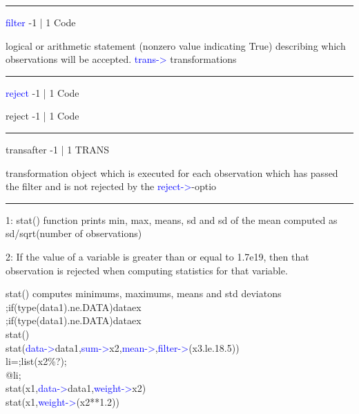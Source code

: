 \vspace{0.3cm}
\hrule
\vspace{0.3cm}
\noindent \textcolor{blue}{filter}  \tabto{3cm} -1 | 1 \tabto{5cm}  Code \tabto{7cm}
\begin{changemargin}{3cm}{0cm}
\noindent  logical or arithmetic statement (nonzero value indicating True) describing which observations will be accepted. \textcolor{blue}{trans->} transformations
\end{changemargin}
\vspace{0.3cm}
\hrule
\vspace{0.3cm}
\noindent \textcolor{blue}{reject}  \tabto{3cm} -1 | 1 \tabto{5cm}  Code \tabto{7cm}
\begin{changemargin}{3cm}{0cm}
\noindent \noindent reject  \tabto{3cm} -1 | 1 \tabto{5cm}  Code \tabto{7cm}
\end{changemargin}
\vspace{0.3cm}
\hrule
\vspace{0.3cm}
\noindent transafter  \tabto{3cm} -1 | 1 \tabto{5cm}   TRANS \tabto{7cm}
\begin{changemargin}{3cm}{0cm}
\noindent  transformation object which is executed for each observation which has passed the filter and is not rejected by the \textcolor{blue}{reject->}-optio
\end {changemargin}
\hrule
\vspace{0.2cm}
\begin{note}
1: \textcolor{VioletRed}{stat}() function prints min, max, means, sd and sd of the mean computed
as sd/\textcolor{VioletRed}{sqrt}(number of observations)
\end{note}
\begin{note}
2: If the value of a variable is greater than or equal to 1.7e19,
then that observation is rejected when computing statistics for that variable.
\end{note}
\begin{example}[statex]stat() computes minimums, maximums, means and std deviatons\\
\label{statex}
;if(\textcolor{VioletRed}{type}(data1).ne.DATA)dataex\\
;if(\textcolor{VioletRed}{type}(data1).ne.DATA)dataex\\
\textcolor{VioletRed}{stat}()\\
\textcolor{VioletRed}{stat}(\textcolor{blue}{data->}data1,\textcolor{blue}{sum->}x2,\textcolor{blue}{mean->},\textcolor{blue}{filter->}(x3.le.18.5))\\
li=;list(x2\%?);\\
@li;\\
\textcolor{VioletRed}{stat}(x1,\textcolor{blue}{data->}data1,\textcolor{blue}{weight->}x2)\\
\textcolor{VioletRed}{stat}(x1,\textcolor{blue}{weight->}(x2**1.2))
\end{example}
